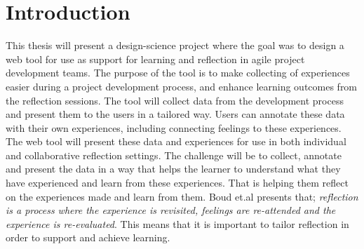 \chapter{Introduction}
This thesis will present a design-science project where the goal was to design a web tool for use as support for learning and reflection in agile project development teams. The purpose of the tool is to make collecting of experiences easier during a project development process, and enhance learning outcomes from the reflection sessions. The tool will collect data from the development process and present them to the users in a tailored way. Users can annotate these data with their own experiences, including connecting feelings to these experiences. The web tool will present these data and experiences for use in both individual and collaborative reflection settings. The challenge will be to collect, annotate and present the data in a way that helps the learner to understand what they have experienced and learn from these experiences. That is helping them reflect on the experiences made and learn from them. Boud et.al\cite{boudreflection1985} presents that; \emph{reflection is a process where the experience is revisited, feelings are re-attended and the experience is re-evaluated}. This means that it is important to tailor reflection in order to support and achieve learning.


